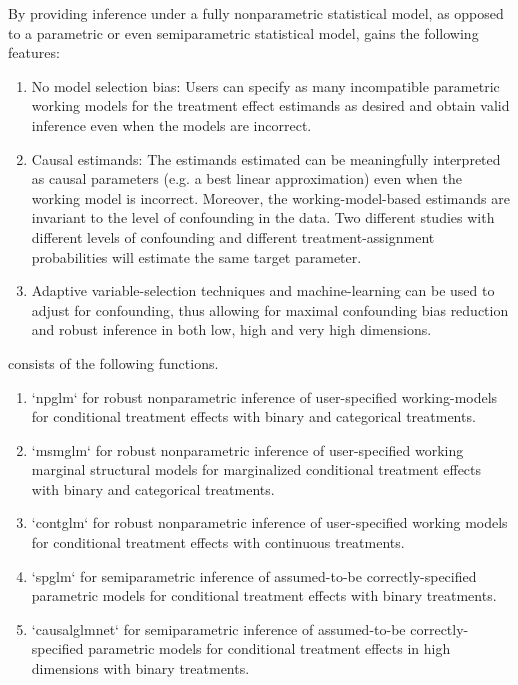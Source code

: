 \documentclass[
]{jss}
\begin{document}
By providing inference under a fully nonparametric statistical model, as
opposed to a parametric or even semiparametric statistical model,
 gains the following features:

\begin{enumerate}
\item No model selection bias: Users can specify as many incompatible parametric working models for the treatment effect estimands as desired and obtain valid inference even when the models are incorrect. 
\item Causal estimands: The estimands estimated can be meaningfully interpreted as causal parameters (e.g. a best linear approximation) even when the working model is incorrect. Moreover, the working-model-based estimands are invariant to the level of confounding in the data. Two different studies with different levels of confounding and different treatment-assignment probabilities will estimate the same target parameter.
\item Adaptive variable-selection techniques and machine-learning can be used to adjust for confounding, thus allowing for maximal confounding bias reduction and robust inference in both low, high and very high dimensions.
\end{enumerate}

 consists of the following functions.

\begin{enumerate}
\item `npglm` for robust nonparametric inference of user-specified working-models for conditional treatment effects with binary and categorical treatments.
\item `msmglm` for robust nonparametric inference of user-specified working marginal structural models for marginalized conditional treatment effects with binary and categorical treatments.
\item `contglm` for robust nonparametric inference of user-specified working models for conditional treatment effects with continuous treatments.
\item `spglm` for semiparametric inference of assumed-to-be correctly-specified parametric models for conditional treatment effects with binary treatments.
\item `causalglmnet` for semiparametric inference of assumed-to-be correctly-specified parametric models for conditional treatment effects in high dimensions with binary treatments.
\end{enumerate}
\end{document}
